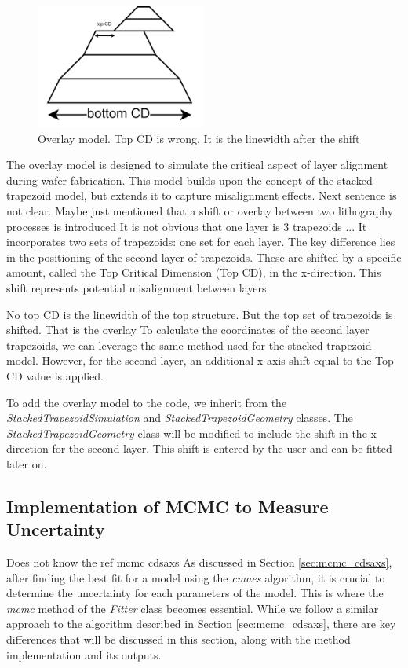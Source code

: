 \begin{figure}[h]
    \centering
    \includegraphics[width=0.5\textwidth]{images/overlay.PNG}
    \caption{Overlay model. \color{red} Top CD is wrong. It is the linewidth after the shift \color{black} 
    }
    \label{fig:overlay}
\end{figure}

\FloatBarrier

The overlay model is designed to simulate the critical aspect of layer alignment during wafer 
fabrication. This model builds upon the concept of the stacked trapezoid model, but extends it to 
capture misalignment effects. 
\color{red} Next sentence is not clear. Maybe just mentioned that a shift or overlay between two lithography processes is introduced
It is not obvious that one layer is 3 trapezoids ...\color{black}
It incorporates two sets of trapezoids: one set for each layer. The 
key difference lies in the positioning of the second layer of trapezoids. These are shifted by a 
specific amount, called the Top Critical Dimension (Top CD), in the x-direction. This shift 
represents potential misalignment between layers.

\medskip
\color{red} No top CD is the linewidth of the top structure. 
But the top set of trapezoids is shifted. That is the overlay\color{black}
To calculate the coordinates of the second layer trapezoids, we can leverage the same method 
used for the stacked trapezoid model. However, for the second layer, an additional x-axis shift 
equal to the Top CD value is applied.

\medskip

To add the overlay model to the code, we inherit from the \textit{StackedTrapezoidSimulation} and \textit{StackedTrapezoidGeometry} classes.
The \textit{StackedTrapezoidGeometry} class will be modified to include the shift in the x direction for the second layer. This shift is entered by the
user and can be fitted later on.

\subsection{Implementation of MCMC to Measure Uncertainty}
\color{red} Does not know the ref mcmc cdsaxs \color{black}
As discussed in Section \ref{sec:mcmc_cdsaxs}, after finding the best fit for a model using the \textit{cmaes} algorithm, it is crucial 
to determine the uncertainty for each parameters of the model. This is where the \textit{mcmc} method of the \textit{Fitter} class becomes essential. 
While we follow a similar approach to the algorithm described in Section \ref{sec:mcmc_cdsaxs}, there are key differences that will be discussed 
in this section, along with the method implementation and its outputs.


